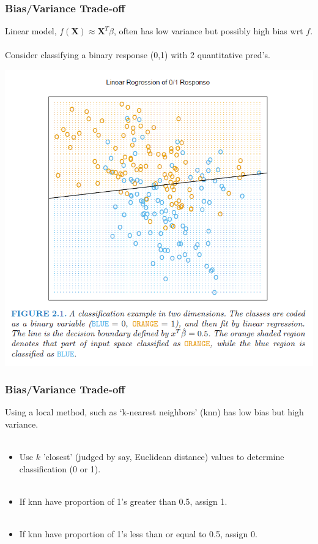 \documentclass[hide notes,red,handout]{beamer}
\begin{document}
\begin{frame}[t]
\frametitle{Bias/Variance Trade-off}
Linear model, $f(\textbf{X})\approx\textbf{X}^T\beta$, often has low variance but possibly high bias wrt $f$.\\~\\
Consider classifying a binary response (0,1) with 2 quantitative pred's.
\begin{center}
\includegraphics[scale=0.3]{biasslr}
\end{center}
\end{frame}

\begin{frame}[t]
\frametitle{Bias/Variance Trade-off}
Using a local method, such as `k-nearest neighbors' (knn) has low bias but high variance.\\~\\\pause
\begin{itemize}
\item Use $k$ 'closest' (judged by say, Euclidean distance) values to determine classification (0 or 1).  \\~\\
\item If knn have proportion of 1's greater than 0.5, assign 1.\\~\\
\item If knn have proportion of 1's less than or equal to 0.5, assign 0.
\end{itemize}
\end{frame}
\end{document}
